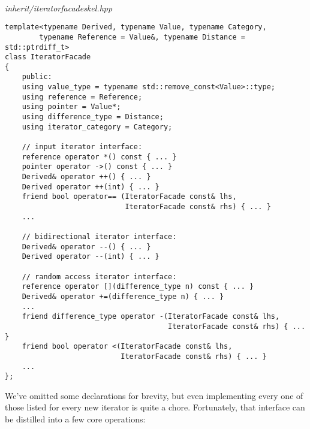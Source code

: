 \hspace*{\fill} \\ %
\noindent
\textit{inherit/iteratorfacadeskel.hpp}
\begin{lstlisting}[style=styleCXX]
template<typename Derived, typename Value, typename Category,
		typename Reference = Value&, typename Distance = std::ptrdiff_t>
class IteratorFacade
{
	public:
	using value_type = typename std::remove_const<Value>::type;
	using reference = Reference;
	using pointer = Value*;
	using difference_type = Distance;
	using iterator_category = Category;
	
	// input iterator interface:
	reference operator *() const { ... }
	pointer operator ->() const { ... }
	Derived& operator ++() { ... }
	Derived operator ++(int) { ... }
	friend bool operator== (IteratorFacade const& lhs,
						    IteratorFacade const& rhs) { ... }
	...
	
	// bidirectional iterator interface:
	Derived& operator --() { ... }
	Derived operator --(int) { ... }
	
	// random access iterator interface:
	reference operator [](difference_type n) const { ... }
	Derived& operator +=(difference_type n) { ... }
	...
	friend difference_type operator -(IteratorFacade const& lhs,
									  IteratorFacade const& rhs) { ... }
	friend bool operator <(IteratorFacade const& lhs,
						   IteratorFacade const& rhs) { ... }
	...
};
\end{lstlisting}

We’ve omitted some declarations for brevity, but even implementing every one of those listed for every new iterator is quite a chore. Fortunately, that interface can be distilled into a few core operations:

